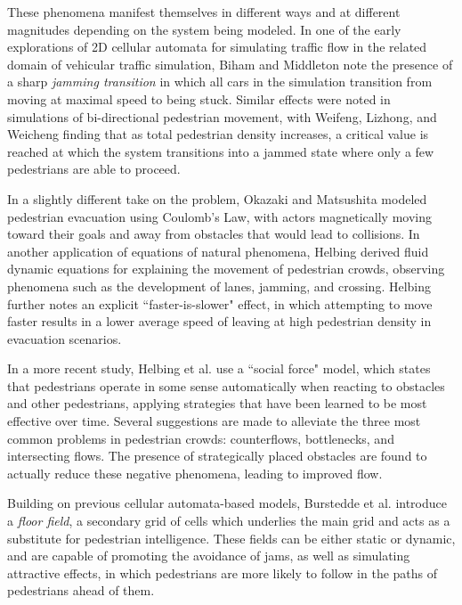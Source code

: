 \documentclass[12pt]{article}
\begin{document}
These phenomena manifest themselves in different ways and at different
magnitudes depending on the system being modeled. In one of the early
explorations of 2D cellular automata for simulating traffic flow in the related
domain of vehicular traffic simulation, Biham and Middleton \cite{biham1992self}
note the presence of a sharp
\textit{jamming transition} in which all cars in the simulation transition from
moving at maximal speed to being stuck. Similar effects were noted in
simulations of bi-directional pedestrian movement, with Weifeng, Lizhong, and
Weicheng \cite{weifeng2003simulation} finding that as total pedestrian density
increases, a critical value is reached at which the system transitions into a
jammed state where only a few pedestrians are able to proceed.

In a slightly different take on the problem, Okazaki and Matsushita
\cite{okazaki1993study} modeled pedestrian evacuation using Coulomb's Law, with
actors magnetically moving toward their goals and away from obstacles that would
lead to collisions. In another application of equations of natural phenomena,
Helbing \cite{helbing1998fluid} derived fluid dynamic equations for explaining
the movement of pedestrian crowds, observing phenomena such as the development
of lanes, jamming, and crossing. Helbing \cite{helbing2000simulating} further
notes an explicit “faster-is-slower" effect, in which attempting to move faster
results in a lower average speed of leaving at high pedestrian density in
evacuation scenarios.

In a more recent study, Helbing et al. \cite{helbing2005self} use a
“social force" model, which states that pedestrians operate in some sense
automatically when reacting to obstacles and other pedestrians, applying
strategies that have been learned to be most effective over time. Several
suggestions are made to alleviate the three most common problems in pedestrian
crowds: counterflows, bottlenecks, and intersecting flows. The presence of
strategically placed obstacles are found to actually reduce these negative
phenomena, leading to improved flow.

Building on previous cellular automata-based models, Burstedde et al.
\cite{burstedde2001simulation} introduce a \textit{floor field}, a secondary
grid of cells which underlies the main grid and acts as a substitute for
pedestrian intelligence. These fields can be either static or dynamic, and are
capable of promoting the avoidance of jams, as well as simulating attractive
effects, in which pedestrians are more likely to follow in the paths of
pedestrians ahead of them.
\end{document}
